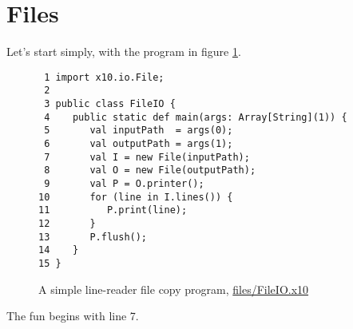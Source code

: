 \section{Files}\label{sec:files}
Let's start simply, with the program in figure \ref{fig:flc}.  
\begin{figure}[!htbp]
\hrulefill
\begin{verbatim}
 1 import x10.io.File;
 2 
 3 public class FileIO {
 4    public static def main(args: Array[String](1)) {
 5       val inputPath  = args(0);
 6       val outputPath = args(1);
 7       val I = new File(inputPath);
 8       val O = new File(outputPath);
 9       val P = O.printer();
10       for (line in I.lines()) {
11          P.print(line);
12       }
13       P.flush();
14    }
15 }
\end{verbatim}
\caption{A simple line-reader file copy program,
\href{http://dist.codehaus.org/x10/documentation/guide/src/files/FileIO.x10}{files/FileIO.x10}}\label{fig:flc}
\hrulefill
\end{figure}
The fun begins with line 7.
